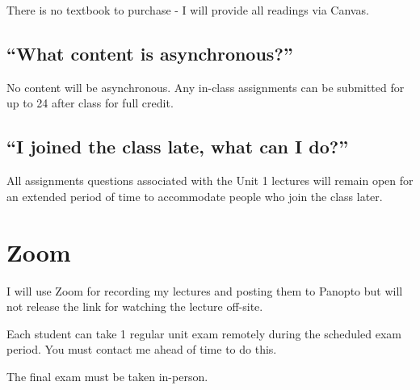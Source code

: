 \documentclass[
]{book}
\begin{document}
There is no textbook to purchase - I will provide all readings via Canvas.

\hypertarget{what-content-is-asynchronous}{%
\section{``What content is asynchronous?''}\label{what-content-is-asynchronous}}

No content will be asynchronous. Any in-class assignments can be submitted for up to 24 after class for full credit.

\hypertarget{i-joined-the-class-late-what-can-i-do}{%
\section{``I joined the class late, what can I do?''}\label{i-joined-the-class-late-what-can-i-do}}

All assignments questions associated with the Unit 1 lectures will remain open for an extended period of time to accommodate people who join the class later.

\hypertarget{zoom}{%
\chapter{Zoom}\label{zoom}}

I will use Zoom for recording my lectures and posting them to Panopto but will not release the link for watching the lecture off-site.

Each student can take 1 regular unit exam remotely during the scheduled exam period. You must contact me ahead of time to do this.

The final exam must be taken in-person.
\end{document}
